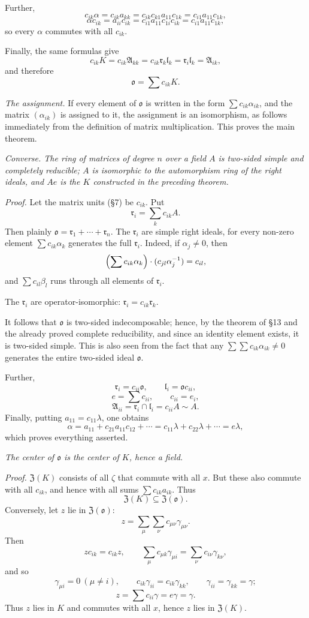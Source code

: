 \documentclass[11pt]{article}
\providecommand{\mA}{\mathfrak{A}}
\providecommand{\mo}{\mathfrak{o}}
\providecommand{\ml}{\mathfrak{l}}
\providecommand{\mr}{\mathfrak{r}}
\providecommand{\mZ}{\mathfrak{Z}}
\begin{document}
Further,
\[
        c_{ik}\alpha=c_{ik}a_{kk}=c_{ik}c_{k1}a_{11}c_{1k}=c_{i1}a_{11}c_{1k},
\]
\[
        \alpha c_{ik}=a_{ii}c_{ik}=c_{i1}a_{11}c_{1i}c_{ik}=c_{i1}a_{11}c_{1k},
\]
so every $\alpha$ commutes with all $c_{ik}$.

Finally, the same formulas give
\[
        c_{ik}K=c_{ik}\mA_{kk}=c_{ik}\mr_k\ml_k=\mr_i\ml_k=\mA_{ik},
\]
and therefore
\[
        \mo=\sum c_{ik}K.
\]

\emph{The assignment.} If every element of $\mo$ is written in the form $\sum c_{ik}\alpha_{ik}$, and the matrix $(\alpha_{ik})$ is assigned to it, the assignment is an isomorphism, as follows immediately from the definition of matrix multiplication. This proves the main theorem.

\emph{Converse. The ring of matrices of degree $n$ over a field $A$ is two-sided simple and completely reducible; $A$ is isomorphic to the automorphism ring of the right ideals, and $Ae$ is the $K$ constructed in the preceding theorem.}

\emph{Proof.} Let the matrix units (§7) be $c_{ik}$. Put
\[
        \mr_i=\sum_k c_{ik}A.
\]
Then plainly $\mo=\mr_1+\cdots+\mr_n$. The $\mr_i$ are simple right ideals, for every non-zero element $\sum c_{ik}\alpha_k$ generates the full $\mr_i$. Indeed, if $\alpha_j\ne0$, then
\[
        \Bigl(\sum c_{ik}\alpha_k\Bigr)\cdot(c_{jl}\alpha_j^{-1})=c_{il},
\]
and $\sum c_{il}\beta_l$ runs through all elements of $\mr_i$.

The $\mr_i$ are operator-isomorphic: $\mr_i=c_{ik}\mr_k$.

It follows that $\mo$ is two-sided indecomposable; hence, by the theorem of §13 and the already proved complete reducibility, and since an identity element exists, it is two-sided simple. This is also seen from the fact that any $\sum\sum c_{ik}\alpha_{ik}\ne0$ generates the entire two-sided ideal $\mo$.

Further,
\[
        \mr_i=c_{ii}\mo,
        \qquad
        \ml_i=\mo c_{ii},
\]
\[
        e=\sum c_{ii},
        \qquad c_{ii}=e_i,
\]
\[
        \mA_{ii}=\mr_i\cap\ml_i=c_{ii}A\sim A.
\]
Finally, putting $a_{11}=c_{11}\lambda$, one obtains
\[
        \alpha=a_{11}+c_{21}a_{11}c_{12}+\cdots
        =c_{11}\lambda+c_{22}\lambda+\cdots=e\lambda,
\]
which proves everything asserted.

\emph{The center of $\mo$ is the center of $K$, hence a field.}

\emph{Proof.} $\mZ(K)$ consists of all $\zeta$ that commute with all $x$. But these also commute with all $c_{ik}$, and hence with all sums $\sum c_{ik}a_{ik}$. Thus
\[
        \mZ(K)\subseteq\mZ(\mo).
\]
Conversely, let $z$ lie in $\mZ(\mo)$:
\[
        z=\sum_\mu\sum_\nu c_{\mu\nu}\gamma_{\mu\nu}.
\]
Then
\[
        zc_{ik}=c_{ik}z,
        \qquad
        \sum_\mu c_{\mu k}\gamma_{\mu i}=\sum_\nu c_{i\nu}\gamma_{k\nu},
\]
and so
\[
        \gamma_{\mu i}=0\ (\mu\ne i),
        \qquad
        c_{ik}\gamma_{ii}=c_{ik}\gamma_{kk},
        \qquad
        \gamma_{ii}=\gamma_{kk}=\gamma;
\]
\[
        z=\sum c_{ii}\gamma=e\gamma=\gamma.
\]
Thus $z$ lies in $K$ and commutes with all $x$, hence $z$ lies in $\mZ(K)$.
\end{document}
